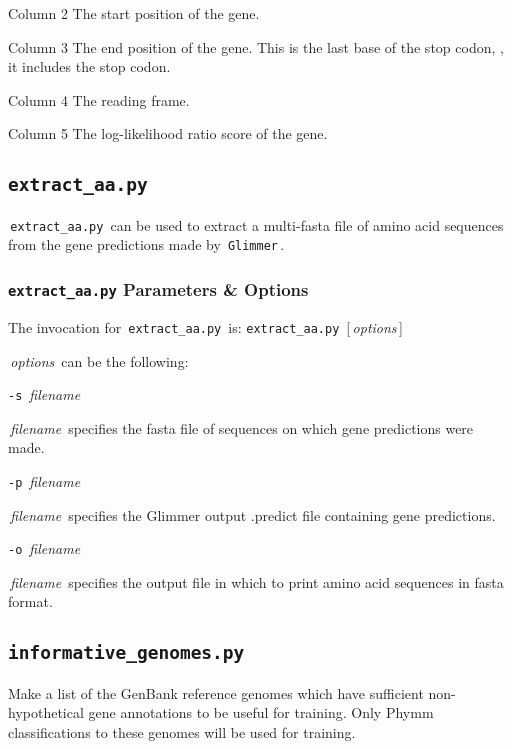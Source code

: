 \documentclass[fleqn,titlepage,11pt]{article}
\def\Desc#1{\,\mbox{\emph{#1}}\,}
\def\Pg#1{\texttt{#1}}
\begin{document}
\item[Column 2]
  The start position of the gene.

\item[Column 3]
  The end position of the gene.  This is the last base of the stop codon, \ie,
  it includes the stop codon.

\item[Column 4]
  The reading frame.

\item[Column 5]
  The log-likelihood ratio score of the gene.
\el

\subsection{\Pg{extract\_aa.py}}
\,\Pg{extract\_aa.py}\, can be used to extract a multi-fasta file of
amino acid sequences from the gene predictions made by
\,\Pg{Glimmer}\,.

\subsubsection{\Pg{extract\_aa.py} Parameters \& Options}

The invocation for \,\Pg{extract\_aa.py}\, is:
\bq
  \Pg{extract\_aa.py}\, [\Desc{options}]
\eq

\Desc{options} can be the following:
\bl{}\RaggedRight

\exdent
  \verb`-s` \Desc{filename}

  \Desc{filename} specifies the fasta file of sequences on which
  gene predictions were made.

\exdent
  \verb`-p` \Desc{filename}

  \Desc{filename} specifies the Glimmer output .predict file
  containing gene predictions.

\exdent
  \verb`-o` \Desc{filename}

  \Desc{filename} specifies the output file in which to print
  amino acid sequences in fasta format.

\el

\subsection{\Pg{informative\_genomes.py}}

Make a list of the GenBank reference genomes which have sufficient
non-hypothetical gene annotations to be useful for training. Only
Phymm classifications to these genomes will be used for training.
\end{document}
